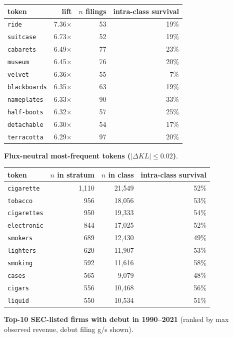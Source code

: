 \begin{tabular}{lrrr}
\toprule
token & lift & $n$ filings & intra-class survival \\
\midrule
\texttt{ride} & 7.36$\times$ & 53 & 19\% \\
\texttt{suitcase} & 6.73$\times$ & 52 & 19\% \\
\texttt{cabarets} & 6.49$\times$ & 77 & 23\% \\
\texttt{museum} & 6.45$\times$ & 76 & 20\% \\
\texttt{velvet} & 6.36$\times$ & 55 & 7\% \\
\texttt{blackboards} & 6.35$\times$ & 63 & 19\% \\
\texttt{nameplates} & 6.33$\times$ & 90 & 33\% \\
\texttt{half-boots} & 6.32$\times$ & 57 & 25\% \\
\texttt{detachable} & 6.30$\times$ & 54 & 17\% \\
\texttt{terracotta} & 6.29$\times$ & 97 & 20\% \\
\bottomrule
\end{tabular}

\textbf{Flux-neutral most-frequent tokens ($|\Delta KL|\leq 0.02$)}.

\begin{tabular}{lrrr}
\toprule
token & $n$ in stratum & $n$ in class & intra-class survival \\
\midrule
\texttt{cigarette} & 1,110 & 21,549 & 52\% \\
\texttt{tobacco} & 956 & 18,056 & 53\% \\
\texttt{cigarettes} & 950 & 19,333 & 54\% \\
\texttt{electronic} & 844 & 17,025 & 52\% \\
\texttt{smokers} & 689 & 12,430 & 49\% \\
\texttt{lighters} & 620 & 11,907 & 53\% \\
\texttt{smoking} & 592 & 11,616 & 58\% \\
\texttt{cases} & 565 & 9,079 & 48\% \\
\texttt{cigars} & 556 & 10,468 & 56\% \\
\texttt{liquid} & 550 & 10,534 & 51\% \\
\bottomrule
\end{tabular}

\textbf{Top-10 SEC-listed firms with debut in 1990--2021} (ranked by max observed revenue, debut filing g/s shown).

